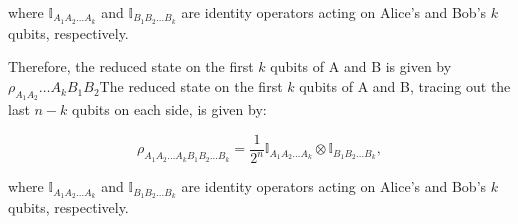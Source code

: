 \documentclass{article}
\begin{document}
where $\mathbb{I}_{A_1A_2\ldots A_k}$ and $\mathbb{I}_{B_1B_2\ldots B_k}$ are identity operators acting on Alice's and Bob's $k$ qubits, respectively.

Therefore, the reduced state on the first $k$ qubits of A and B is given by $\rho_{A_1A_2}\ldots A_kB_1B_2$The reduced state on the first $k$ qubits of A and B, tracing out the last $n-k$ qubits on each side, is given by:

$$\rho_{A_1A_2\ldots A_kB_1B_2\ldots B_k} = \frac{1}{2^n} \mathbb{I}_{A_1A_2\ldots A_k} \otimes \mathbb{I}_{B_1B_2\ldots B_k},$$

where $\mathbb{I}_{A_1A_2\ldots A_k}$ and $\mathbb{I}_{B_1B_2\ldots B_k}$ are identity operators acting on Alice's and Bob's $k$ qubits, respectively.
\end{document}
